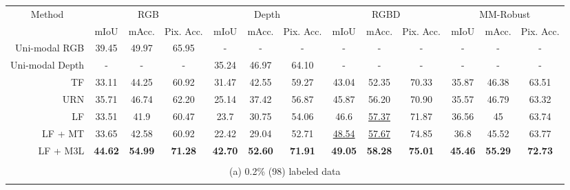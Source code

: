 \documentclass[10pt,twocolumn,letterpaper]{article}
\begin{document}
\begin{table*}[h]
{\begin{tabular}{rccc|ccc|ccc|ccc}
\toprule
\multicolumn{1}{c}{\multirow{2}{*}{Method}} & \multicolumn{3}{c|}{RGB} & \multicolumn{3}{c|}{Depth} & \multicolumn{3}{c|}{RGBD} & \multicolumn{3}{c}{MM-Robust} \\
\multicolumn{1}{c}{} & mIoU & mAcc. & Pix. Acc. & mIoU & mAcc. & Pix. Acc. & mIoU & mAcc. & Pix. Acc. & mIoU & mAcc. & Pix. Acc. \\ \midrule
Uni-modal RGB & 39.45 & 49.97 & 65.95 & - & - & - & - & - & - & - & - & - \\
Uni-modal Depth & - & - & - & 35.24 & 46.97 & 64.10 & - & - & - & - & - & - \\
TF \cite{tokenfusion} & 33.11 & 44.25 & 60.92 & 31.47 & 42.55 & 59.27 & 43.04 & 52.35 & 70.33 & 35.87 & 46.38 & 63.51 \\
URN \cite{urn} & 35.71 & 46.74 & 62.20 & 25.14 & 37.42 & 56.87 & 45.87 & 56.20 & 70.90 & 35.57 & 46.79 & 63.32 \\
LF & 33.51 & 41.9 & 60.47 & 23.7 & 30.75 & 54.06 & 46.6 & \underline{57.37} & 71.87 & 36.56 & 45 & 63.74 \\ \midrule
LF + MT & 33.65 & 42.58 & 60.92 & 22.42 & 29.04 & 52.71 & \underline{48.54} & \underline{57.67} & 74.85 & 36.8 & 45.52 & 63.77 \\
LF + M3L & \textbf{44.62} & \textbf{54.99} & \textbf{71.28} & \textbf{42.70} & \textbf{52.60} & \textbf{71.91} & \textbf{49.05} & \textbf{58.28} & \textbf{75.01} & \textbf{45.46} & \textbf{55.29} & \textbf{72.73} \\ \bottomrule


\multicolumn{13}{c}{\vspace{0.1cm}}\\
\multicolumn{13}{c}{(a) 0.2\% (98) labeled data}\\
\multicolumn{13}{c}{\vspace{0.4cm}}\\




\end{tabular}}
\end{table*}
\end{document}
